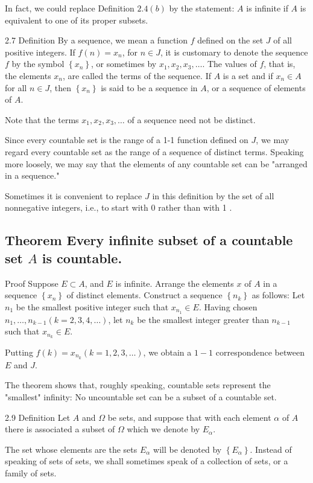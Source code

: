 \documentclass[10pt]{article}
\begin{document}
In fact, we could replace Definition $2.4(b)$ by the statement: $A$ is infinite if $A$ is equivalent to one of its proper subsets.

2.7 Definition By a sequence, we mean a function $f$ defined on the set $J$ of all positive integers. If $f(n)=x_{n}$, for $n \in J$, it is customary to denote the sequence $f$ by the symbol $\left\{x_{n}\right\}$, or sometimes by $x_{1}, x_{2}, x_{3}, \ldots$. The values of $f$, that is, the elements $x_{n}$, are called the terms of the sequence. If $A$ is a set and if $x_{n} \in A$ for all $n \in J$, then $\left\{x_{n}\right\}$ is said to be a sequence in $A$, or a sequence of elements of $A$.

Note that the terms $x_{1}, x_{2}, x_{3}, \ldots$ of a sequence need not be distinct.

Since every countable set is the range of a 1-1 function defined on $J$, we may regard every countable set as the range of a sequence of distinct terms. Speaking more loosely, we may say that the elements of any countable set can be "arranged in a sequence."

Sometimes it is convenient to replace $J$ in this definition by the set of all nonnegative integers, i.e., to start with 0 rather than with 1 .

\subsection{Theorem Every infinite subset of a countable set $A$ is countable.}
Proof Suppose $E \subset A$, and $E$ is infinite. Arrange the elements $x$ of $A$ in a sequence $\left\{x_{n}\right\}$ of distinct elements. Construct a sequence $\left\{n_{k}\right\}$ as follows: Let $n_{1}$ be the smallest positive integer such that $x_{n_{1}} \in E$. Having chosen $n_{1}, \ldots, n_{k-1}(k=2,3,4, \ldots)$, let $n_{k}$ be the smallest integer greater than $n_{k-1}$ such that $x_{n_{k}} \in E$.

Putting $f(k)=x_{n_{k}}(k=1,2,3, \ldots)$, we obtain a $1-1$ correspondence between $E$ and $J$.

The theorem shows that, roughly speaking, countable sets represent the "smallest" infinity: No uncountable set can be a subset of a countable set.

2.9 Definition Let $A$ and $\Omega$ be sets, and suppose that with each element $\alpha$ of $A$ there is associated a subset of $\Omega$ which we denote by $E_{\alpha}$.

The set whose elements are the sets $E_{\alpha}$ will be denoted by $\left\{E_{\alpha}\right\}$. Instead of speaking of sets of sets, we shall sometimes speak of a collection of sets, or a family of sets.
\end{document}
